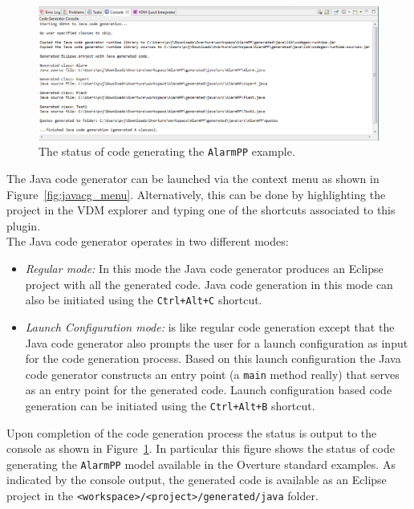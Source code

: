 \begin{figure}[htbp]
\begin{center}
\includegraphics[width=\linewidth]{screenDumps/javacg_output}
\caption{The status of code generating the \texttt{AlarmPP} example.\label{fig:javacg_output}}
\end{center}
\end{figure}

The Java code generator can be launched via the context menu as shown
in Figure~\ref{fig:javacg_menu}. Alternatively, this can be done by
highlighting the project in the VDM explorer and typing one of the
shortcuts associated to this plugin.\\

\noindent The Java code generator operates in two different modes:

\begin{itemize}

\item \emph{Regular mode:} In this mode the Java code generator
  produces an Eclipse project with all the generated code. Java code
  generation in this mode can also be initiated using the
  \texttt{Ctrl+Alt+C} shortcut.

\item \emph{Launch Configuration mode:} is like regular code
  generation except that the Java code generator also prompts the user
  for a launch configuration as input for the code generation
  process. Based on this launch configuration the Java code generator
  constructs an entry point (a \texttt{main} method really) that
  serves as an entry point for the generated code. Launch
  configuration based code generation can be initiated using the
  \texttt{Ctrl+Alt+B} shortcut.

\end{itemize}

\noindent Upon completion of the code generation process the status is
output to the console as shown in Figure~\ref{fig:javacg_output}. In
particular this figure shows the status of code generating the
\texttt{AlarmPP} model available in the Overture standard examples. As
indicated by the console output, the generated code is available as an
Eclipse project in the \texttt{<workspace>/<project>/generated/java}
folder.

